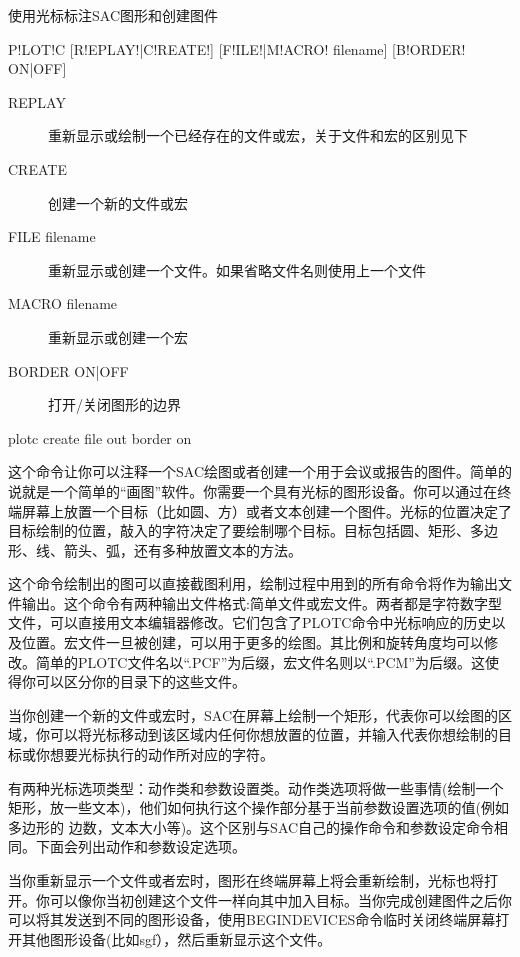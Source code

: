 \label{cmd:plotc}

使用光标标注SAC图形和创建图件

\begin{SACSTX}
P!LOT!C [R!EPLAY!|C!REATE!] [F!ILE!|M!ACRO! filename] [B!ORDER! ON|OFF] 
\end{SACSTX}

\begin{description}
\item [REPLAY] 重新显示或绘制一个已经存在的文件或宏，关于文件和宏的区别见下 
\item [CREATE] 创建一个新的文件或宏 
\item [FILE filename] 重新显示或创建一个文件。如果省略文件名则使用上一个文件
\item [MACRO filename] 重新显示或创建一个宏 
\item [BORDER ON|OFF] 打开/关闭图形的边界 
\end{description}

\begin{SACDFT}
plotc create file out border on
\end{SACDFT}

这个命令让你可以注释一个SAC绘图或者创建一个用于会议或报告的图件。简单的说就是一个简单的``画图''软件。你需要一个具有光标的图形设备。你可以通过在终端屏幕上放置一个目标（比如圆、方）或者文本创建一个图件。光标的位置决定了目标绘制的位置，敲入的字符决定了要绘制哪个目标。目标包括圆、矩形、多边形、线、箭头、弧，还有多种放置文本的方法。

这个命令绘制出的图可以直接截图利用，绘制过程中用到的所有命令将作为输出文件输出。这个命令有两种输出文件格式:简单文件或宏文件。两者都是字符数字型文件，可以直接用文本编辑器修改。它们包含了PLOTC命令中光标响应的历史以及位置。宏文件一旦被创建，可以用于更多的绘图。其比例和旋转角度均可以修改。简单的PLOTC文件名以``.PCF''为后缀，宏文件名则以``.PCM''为后缀。这使得你可以区分你的目录下的这些文件。

当你创建一个新的文件或宏时，SAC在屏幕上绘制一个矩形，代表你可以绘图的区域，你可以将光标移动到该区域内任何你想放置的位置，并输入代表你想绘制的目标或你想要光标执行的动作所对应的字符。

有两种光标选项类型：动作类和参数设置类。动作类选项将做一些事情(绘制一个矩形，放一些文本)，他们如何执行这个操作部分基于当前参数设置选项的值(例如多边形的	边数，文本大小等)。这个区别与SAC自己的操作命令和参数设定命令相同。下面会列出动作和参数设定选项。

当你重新显示一个文件或者宏时，图形在终端屏幕上将会重新绘制，光标也将打开。你可以像你当初创建这个文件一样向其中加入目标。当你完成创建图件之后你可以将其发送到不同的图形设备，使用BEGINDEVICES命令临时关闭终端屏幕打开其他图形设备(比如sgf），然后重新显示这个文件。

